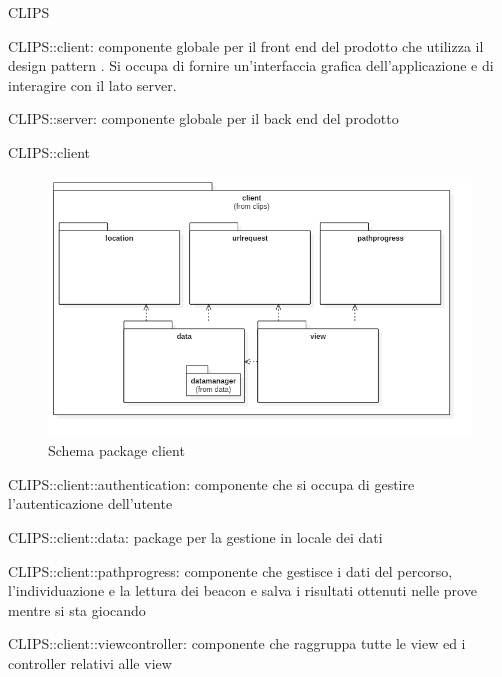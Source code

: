 \begin{componente}{CLIPS}
\begin{compPackageContenuti}
\item CLIPS::client: componente globale per il front end del prodotto che utilizza il design pattern . Si occupa di fornire un'interfaccia grafica dell'applicazione e di interagire con il lato server.
\item CLIPS::server: componente globale per il back end del prodotto
\end{compPackageContenuti}
\end{componente}
\begin{componente}{CLIPS::client}
\begin{figure}[h!]
\centering
\includegraphics[scale=0.5]{img/package/png/client.png}
\caption{Schema package client}
 \end{figure}
\begin{compPackageContenuti}
\item CLIPS::client::authentication: componente che si occupa di gestire l'autenticazione dell'utente
\item CLIPS::client::data: package per la gestione in locale dei dati
\item CLIPS::client::pathprogress: componente che gestisce i dati del percorso, l'individuazione e la lettura dei beacon e salva i risultati ottenuti nelle prove mentre si sta giocando
\item CLIPS::client::viewcontroller: componente che raggruppa tutte le view ed i controller relativi alle view
\end{compPackageContenuti}
\end{componente}

